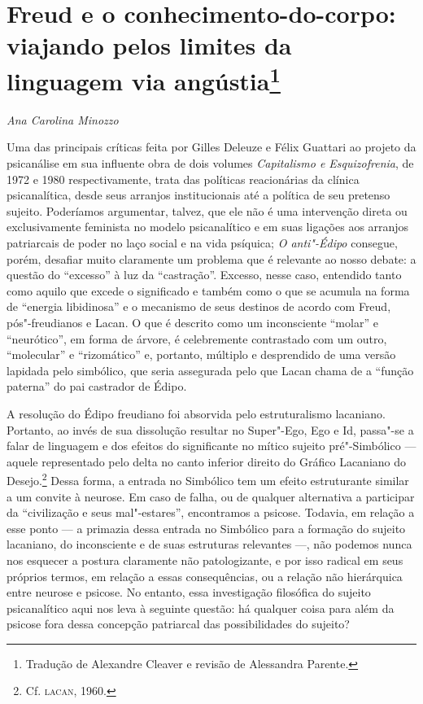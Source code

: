 \chapter*{Freud e o conhecimento-do-corpo: viajando pelos limites da
linguagem via angústia\footnote{Tradução de Alexandre Cleaver e revisão
  de Alessandra Parente.}}

\begin{flushright}
\emph{Ana Carolina Minozzo}
\end{flushright}

Uma das principais críticas feita por Gilles Deleuze e Félix Guattari ao
projeto da psicanálise em sua influente obra de dois volumes
\emph{Capitalismo e Esquizofrenia}, de 1972 e 1980 respectivamente,
trata das políticas reacionárias da clínica psicanalítica, desde seus
arranjos institucionais até a política de seu pretenso sujeito.
Poderíamos argumentar, talvez, que ele não é uma intervenção direta ou
exclusivamente feminista no modelo psicanalítico e em suas ligações aos
arranjos patriarcais de poder no laço social e na vida psíquica;
\emph{O anti"-Édipo} consegue, porém, desafiar muito claramente um
problema que é relevante ao nosso debate: a questão do ``excesso'' à luz
da ``castração''. Excesso, nesse caso, entendido tanto como aquilo que
excede o significado e também como o que se acumula na forma de
``energia libidinosa'' e o mecanismo de seus destinos de acordo com
Freud, pós"-freudianos e Lacan. O que é descrito como um inconsciente
``molar'' e ``neurótico'', em forma de árvore, é celebremente
contrastado com um outro, ``molecular'' e ``rizomático'' e, portanto,
múltiplo e desprendido de uma versão lapidada pelo simbólico, que seria
assegurada pelo que Lacan chama de a ``função paterna'' do pai castrador
de Édipo.

A resolução do Édipo freudiano foi absorvida pelo estruturalismo
lacaniano. Portanto, ao invés de sua dissolução resultar no Super"-Ego,
Ego e Id, passa"-se a falar de linguagem e dos efeitos do significante no
mítico sujeito pré"-Simbólico --- aquele representado pelo delta no canto
inferior direito do Gráfico Lacaniano do Desejo.\footnote{Cf. \textsc{lacan}, 1960.} Dessa
forma, a entrada no Simbólico tem um efeito estruturante similar a um
convite à neurose. Em caso de falha, ou de qualquer alternativa a
participar da ``civilização e seus mal"-estares'', encontramos a psicose.
Todavia, em relação a esse ponto --- a primazia dessa entrada no
Simbólico para a formação do sujeito lacaniano, do inconsciente e de
suas estruturas relevantes ---, não podemos nunca nos esquecer a postura
claramente não patologizante, e por isso radical em seus próprios
termos, em relação a essas consequências, ou a relação não hierárquica
entre neurose e psicose. No entanto, essa investigação filosófica do
sujeito psicanalítico aqui nos leva à seguinte questão: há qualquer
coisa para além da psicose fora dessa concepção patriarcal das
possibilidades do sujeito?

